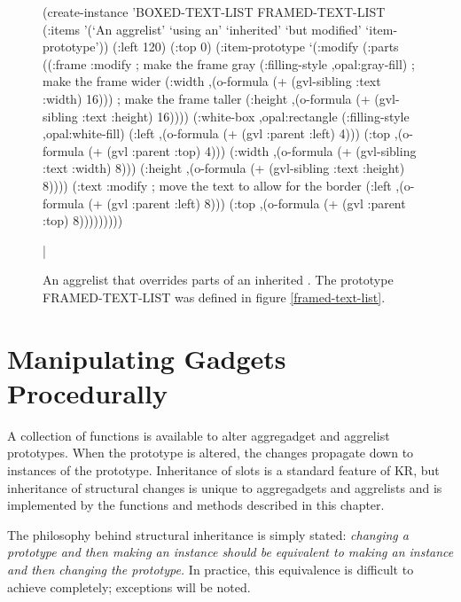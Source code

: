 \begin{figure}
\begin{center}
\end{center}
\begin{programexample}

(create-instance 'BOXED-TEXT-LIST FRAMED-TEXT-LIST
   (:items '(`An aggrelist' `using an' `inherited'
	     `but modified' `item-prototype'))
   (:left 120)
   (:top 0)
   (:item-prototype
    `(:modify
      (:parts
       ((:frame :modify
	   ; make the frame gray
	   (:filling-style ,opal:gray-fill)
	   ; make the frame wider
	   (:width ,(o-formula (+ (gvl-sibling :text :width) 16)))
	   ; make the frame taller
	   (:height ,(o-formula (+ (gvl-sibling :text :height) 16))))
	(:white-box ,opal:rectangle
	   (:filling-style ,opal:white-fill)
	   (:left ,(o-formula (+ (gvl :parent :left) 4)))
	   (:top ,(o-formula (+ (gvl :parent :top) 4)))
	   (:width ,(o-formula (+ (gvl-sibling :text :width) 8)))
	   (:height ,(o-formula (+ (gvl-sibling :text :height) 8))))
	(:text :modify  ; move the text to allow for the border
	   (:left ,(o-formula (+ (gvl :parent :left) 8)))
	   (:top ,(o-formula (+ (gvl :parent :top) 8)))))))))
\end{programexample}
\caption{An aggrelist that overrides parts of an inherited
.  The prototype FRAMED-TEXT-LIST was defined in
figure \ref{framed-text-list}.}
\bar{}
\end{figure}

\section{Manipulating Gadgets Procedurally}

A collection of functions is available to alter aggregadget and
aggrelist prototypes.  When the prototype is altered, the changes
propagate down to instances of the prototype.  Inheritance of slots
is a standard feature of KR, but inheritance of structural changes
is unique to aggregadgets and aggrelists and is implemented by
the functions and methods described in this chapter.

The philosophy behind structural inheritance is simply stated:
{\it changing a prototype and then making an instance should be
equivalent to making an instance and then changing the prototype.}
In practice, this equivalence is difficult to achieve completely;
exceptions will be noted.

